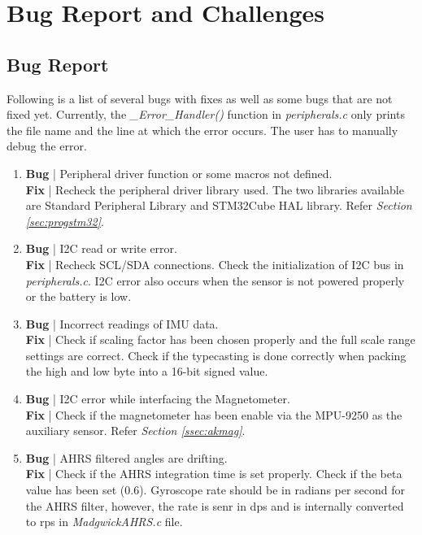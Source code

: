 \documentclass[a4paper,12pt,oneside]{book}
\begin{document}
\chapter[Bug Report and Challenges]{Bug Report and Challenges}
\section{Bug Report}
\label{sec:bugs}

Following is a list of several bugs with fixes as well as some bugs that are not fixed yet. Currently, the \textit{{\_}Error{\_}Handler()} function in \textit{peripherals.c} only prints the file name and the line at which the error occurs. The user has to manually debug the error.\\

\begin{enumerate}
\item \textbf{Bug} | Peripheral driver function or some macros not defined.\\
\textbf{Fix} | Recheck the peripheral driver library used. The two libraries available are Standard Peripheral Library and STM32Cube HAL library. Refer \textit{Section \ref{sec:progstm32}}.\\

\item \textbf{Bug} | I2C read or write error.\\
\textbf{Fix} | Recheck SCL/SDA connections. Check the initialization of I2C bus in \textit{peripherals.c}. I2C error also occurs when the sensor is not powered properly or the battery is low.\\

\item \textbf{Bug} | Incorrect readings of IMU data.\\
\textbf{Fix} | Check if scaling factor has been chosen properly and the full scale range settings are correct. Check if the typecasting is done correctly when packing the high and low byte into a 16-bit signed value.\\

\item \textbf{Bug} | I2C error while interfacing the Magnetometer.\\
\textbf{Fix} | Check if the magnetometer has been enable via the MPU-9250 as the auxiliary sensor. Refer \textit{Section \ref{ssec:akmag}}.\\

\clearpage

\item \textbf{Bug} | AHRS filtered angles are drifting.\\
\textbf{Fix} | Check if the AHRS integration time is set properly. Check if the beta value has been set (0.6). Gyroscope rate should be in radians per second for the AHRS filter, however, the rate is senr in dps and is internally converted to rps in \textit{MadgwickAHRS.c} file.\\


\end{enumerate}
\end{document}

